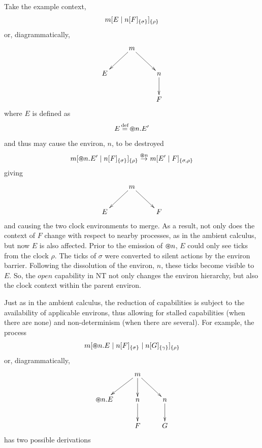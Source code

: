 Take the example context,
\begin{equation}
{m}[ E \;|\; {n}[ F ]_{\{\sigma\}} ]_{\{\rho\}}
\end{equation}
or, diagrammatically,
\[\CompileMatrices
\xymatrix{
&
m \ar@{->}[ld] \ar@{->}[rd] & \\
E & & n \ar@{->}[d] \\
& & F
}
\]
where $E$ is defined as
\begin{equation}
E \operatorname{\stackrel{\textrm{def}}{=}} \varoast n.E^\prime
\end{equation}
and thus may cause the environ, $n$, to be destroyed
\begin{equation}
{m}[ \varoast n.E^\prime \;|\; {n}[ F ]_{\{\sigma\}} ]_{\{\rho\}} \stackrel{\varoast n}{\rightarrow}
{m}[ E^\prime \;|\; F ]_{\{\sigma, \rho\}}
\end{equation}
giving
\[\CompileMatrices
\xymatrix{
&
m \ar@{->}[ld] \ar@{->}[rd] & \\
E & & F
}
\]
and causing the two clock environments to merge.  As a result, not
only does the context of $F$ change with respect to nearby processes,
as in the ambient calculus, but now $E$ is also affected.  Prior to
the emission of $\varoast n$, $E$ could only see ticks from the clock
$\rho$.  The ticks of $\sigma$ were converted to silent actions by the
environ barrier.  Following the dissolution of the environ, $n$, these
ticks become visible to $E$.  So, the $open$ capability in NT not only
changes the environ hierarchy, but also the clock context within the
parent environ.

Just as in the ambient calculus, the reduction of capabilities is
subject to the availability of applicable environs, thus allowing for
stalled capabilities (when there are none) and non-determinism (when
there are several). For example, the process
\begin{equation}
{m}[ \varoast n.E \;|\; {n}[ F ]_{\{\sigma\}} \;|\; {n}[ G ]_{\{\gamma\}} ]_{\{\rho\}}
\end{equation}
or, diagrammatically,
\[\CompileMatrices
\xymatrix{
&
m \ar@{->}[ld] \ar@{->}[d] \ar@{->}[rd] & \\
\tntopen{n}.E & n \ar@{->}[d] & n \ar@{->}[d] \\
& F & G
}
\]
has two possible derivations

